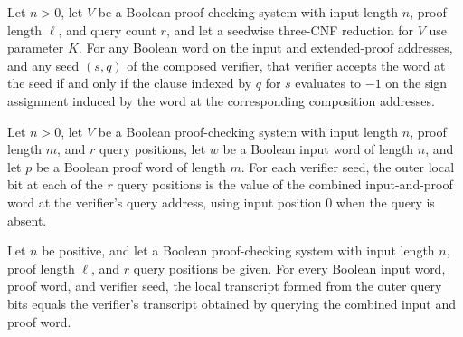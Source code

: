 \begin{theorem}
\label{FABL.composeThreeQueryVerifier_accepts_iff}
\leanok
{}
Let $n>0$, let $V$ be a Boolean proof-checking system with input length $n$, proof
length $\ell$, and query count $r$, and let a seedwise three-CNF reduction for $V$ use
parameter $K$. For any Boolean word on the input and extended-proof addresses, and any
seed $(s,q)$ of the composed verifier, that verifier accepts the word at the seed if and
only if the clause indexed by $q$ for $s$ evaluates to $-1$ on the sign assignment
induced by the word at the corresponding composition addresses.
\end{theorem}

\begin{definition}
\label{FABL.outerLocalBits}
\leanok
{}
Let $n>0$, let $V$ be a Boolean proof-checking system with input length $n$, proof
length $m$, and $r$ query positions, let $w$ be a Boolean input word of length $n$, and
let $p$ be a Boolean proof word of length $m$. For each verifier seed, the outer local
bit at each of the $r$ query positions is the value of the combined input-and-proof word
at the verifier’s query address, using input position $0$ when the query is absent.
\end{definition}

\begin{theorem}
\label{FABL.localTranscript_outerLocalBits}
\leanok
{}
Let $n$ be positive, and let a Boolean proof-checking system with input length $n$,
proof length $\ell$, and $r$ query positions be given. For every Boolean input word,
proof word, and verifier seed, the local transcript formed from the outer query bits
equals the verifier’s transcript obtained by querying the combined input and proof word.
\end{theorem}

